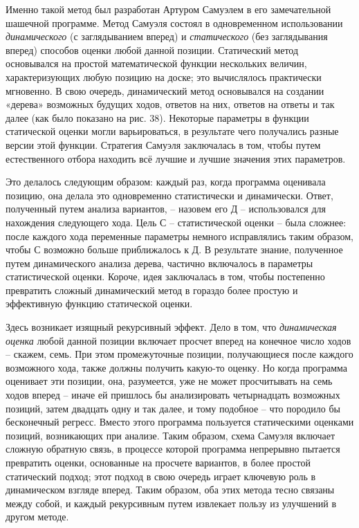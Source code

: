 \documentclass[../main.tex]{subfiles}
\begin{document}
Именно такой метод был разработан Артуром Самуэлем в его замечательной шашечной программе. Метод Самуэля состоял в одновременном использовании \emph{динамического} (с заглядыванием вперед) и \emph{статического} (без заглядывания вперед) способов оценки любой данной позиции. Статический метод основывался на простой математической функции нескольких величин, характеризующих любую позицию на доске; это вычислялось практически мгновенно. В свою очередь, динамический метод основывался на создании «дерева» возможных будущих ходов, ответов на них, ответов на ответы и так далее (как было показано на рис. 38). Некоторые параметры в функции статической оценки могли варьироваться, в результате чего получались разные версии этой функции. Стратегия Самуэля заключалась в том, чтобы путем естественного отбора находить всё лучшие и лучшие значения этих параметров.

Это делалось следующим образом: каждый раз, когда программа оценивала позицию, она делала это одновременно статистически и динамически. Ответ, полученный путем анализа вариантов, \--- назовем его Д \--- использовался для нахождения следующего хода. Цель С \--- статистической оценки \--- была сложнее: после каждого хода переменные параметры немного исправлялись таким образом, чтобы С возможно больше приближалось к Д. В результате знание, полученное путем динамического анализа дерева, частично включалось в параметры статистической оценки. Короче, идея заключалась в том, чтобы постепенно превратить сложный динамический метод в гораздо более простую и эффективную функцию статической оценки.

Здесь возникает изящный рекурсивный эффект. Дело в том, что \emph{динамическая оценка} любой данной позиции включает просчет вперед на конечное число ходов \--- скажем, семь. При этом промежуточные позиции, получающиеся после каждого возможного хода, также должны получить какую-то оценку. Но когда программа оценивает эти позиции, она, разумеется, уже не может просчитывать на семь ходов вперед \--- иначе ей пришлось бы анализировать четырнадцать возможных позиций, затем двадцать одну и так далее, и тому подобное \--- что породило бы бесконечный регресс. Вместо этого программа пользуется статическими оценками позиций, возникающих при анализе. Таким образом, схема Самуэля включает сложную обратную связь, в процессе которой программа непрерывно пытается превратить оценки, основанные на просчете вариантов, в более простой статический подход; этот подход в свою очередь играет ключевую роль в динамическом взгляде вперед. Таким образом, оба этих метода тесно связаны между собой, и каждый рекурсивным путем извлекает пользу из улучшений в другом методе.
\end{document}
